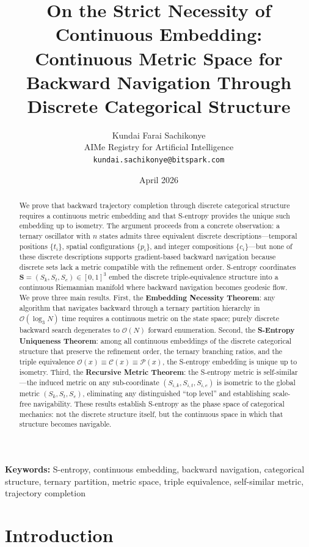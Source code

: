 \documentclass[12pt,twocolumn]{article}
\title{\textbf{On the Strict Necessity of Continuous Embedding:\\
Continuous Metric Space for Backward Navigation Through Discrete Categorical Structure}}
\author{
Kundai Farai Sachikonye\\
AIMe Registry for Artificial Intelligence\\
\texttt{kundai.sachikonye@bitspark.com}
}
\date{April 2026}
\begin{document}
\maketitle

\begin{abstract}
We prove that backward trajectory completion through discrete categorical structure requires a continuous metric embedding and that S-entropy provides the unique such embedding up to isometry. The argument proceeds from a concrete observation: a ternary oscillator with $n$ states admits three equivalent discrete descriptions---temporal positions $\{t_i\}$, spatial configurations $\{p_i\}$, and integer compositions $\{c_i\}$---but none of these discrete descriptions supports gradient-based backward navigation because discrete sets lack a metric compatible with the refinement order. S-entropy coordinates $\mathbf{S} = (S_k, S_t, S_e) \in [0,1]^3$ embed the discrete triple-equivalence structure into a continuous Riemannian manifold where backward navigation becomes geodesic flow. We prove three main results. First, the \textbf{Embedding Necessity Theorem}: any algorithm that navigates backward through a ternary partition hierarchy in $\mathcal{O}(\log_3 N)$ time requires a continuous metric on the state space; purely discrete backward search degenerates to $\mathcal{O}(N)$ forward enumeration. Second, the \textbf{S-Entropy Uniqueness Theorem}: among all continuous embeddings of the discrete categorical structure that preserve the refinement order, the ternary branching ratios, and the triple equivalence $\mathcal{O}(x) \equiv \mathcal{C}(x) \equiv \mathcal{P}(x)$, the S-entropy embedding is unique up to isometry. Third, the \textbf{Recursive Metric Theorem}: the S-entropy metric is self-similar---the induced metric on any sub-coordinate $(S_{i,k}, S_{i,t}, S_{i,e})$ is isometric to the global metric $(S_k, S_t, S_e)$, eliminating any distinguished ``top level'' and establishing scale-free navigability. These results establish S-entropy as the phase space of categorical mechanics: not the discrete structure itself, but the continuous space in which that structure becomes navigable.
\end{abstract}

\textbf{Keywords:} S-entropy, continuous embedding, backward navigation, categorical structure, ternary partition, metric space, triple equivalence, self-similar metric, trajectory completion

\section{Introduction}
\label{sec:introduction}
\end{document}
